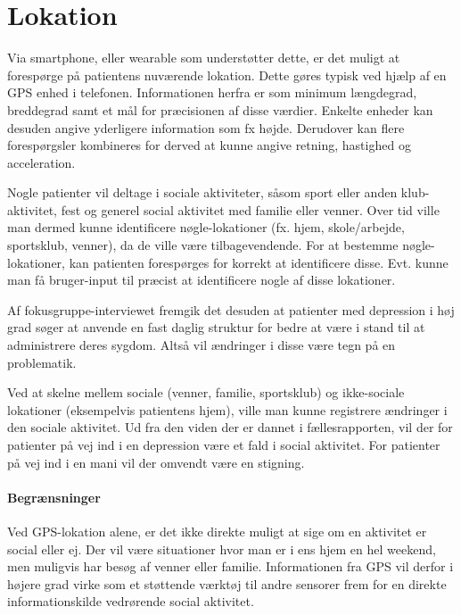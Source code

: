 \section{Lokation}
Via smartphone, eller wearable som understøtter dette, er det muligt at forespørge på patientens nuværende lokation.
Dette gøres typisk ved hjælp af en GPS enhed i telefonen.
Informationen herfra er som minimum længdegrad, breddegrad samt et mål for præcisionen af disse værdier.
Enkelte enheder kan desuden angive yderligere information som fx højde.
Derudover kan flere forespørgsler kombineres for derved at kunne angive retning, hastighed og acceleration.

Nogle patienter vil deltage i sociale aktiviteter, såsom sport eller anden klub-aktivitet, fest og generel social aktivitet med familie eller venner.
Over tid ville man dermed kunne identificere nøgle-lokationer (fx. hjem, skole/arbejde, sportsklub, venner), da de ville være tilbagevendende.
For at bestemme nøgle-lokationer, kan patienten forespørges for korrekt at identificere disse.
Evt. kunne man få bruger-input til præcist at identificere nogle af disse lokationer.

Af fokusgruppe-interviewet fremgik det desuden at patienter med depression i høj grad søger at anvende en fast daglig struktur for bedre at være i stand til at administrere deres sygdom.
Altså vil ændringer i disse være tegn på en problematik.

Ved at skelne mellem sociale (venner, familie, sportsklub) og ikke-sociale lokationer (eksempelvis patientens hjem), ville man kunne registrere ændringer i den sociale aktivitet.
Ud fra den viden der er dannet i fællesrapporten, vil der for patienter på vej ind i en depression være et fald i social aktivitet.
For patienter på vej ind i en mani vil der omvendt være en stigning.

\paragraph{Begrænsninger}
Ved GPS-lokation alene, er det ikke direkte muligt at sige om en aktivitet er social eller ej.
Der vil være situationer hvor man er i ens hjem en hel weekend, men muligvis har besøg af venner eller familie.
Informationen fra GPS vil derfor i højere grad virke som et støttende værktøj til andre sensorer frem for en direkte informationskilde vedrørende social aktivitet.
